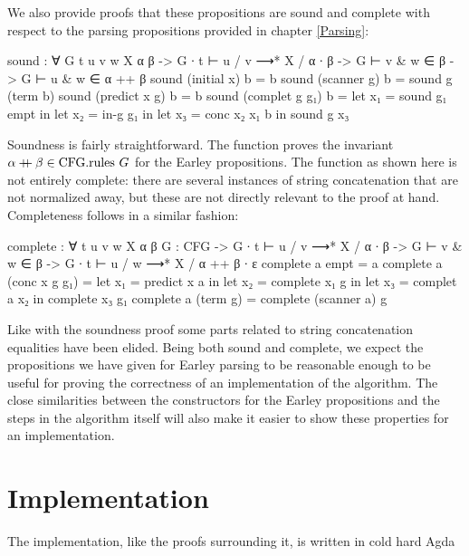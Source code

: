 		We also provide proofs that these propositions are sound and complete
		with respect to the parsing propositions provided in chapter
		\ref{Parsing}:

		\begin{code}

			sound : ∀ {G t u v w X α β} ->
			  G ∙ t ⊢ u / v ⟶* X / α ∙ β ->
			    G ⊢ v & w ∈ β ->
			    G ⊢ u & w ∈ α ++ β
			sound (initial x) b = b
			sound (scanner g) b = sound g (term b)
			sound (predict x g) b = b
			sound (complet g g₁) b =
			  let x₁ = sound g₁ empt in
			  let x₂ = in-g g₁ in
			  let x₃ = conc x₂ x₁ b in
			  sound g x₃
			
		\end{code}
	
		Soundness is fairly straightforward. The  function proves 
		the invariant $\alpha \mathbin{{+}\mspace{-8mu}{+}} \beta \in \textrm{CFG.rules } G$ for the 
		Earley propositions. The function as shown here is not entirely 
		complete: there are several instances of string concatenation that 
		are not normalized away, but these are not directly relevant to the 
		proof at hand. Completeness follows in a similar fashion:
		
		\begin{code}

			complete : ∀ {t u v w X α β} {G : CFG} ->
			  G ∙ t ⊢ u / v ⟶* X / α ∙ β ->
			  G ⊢ v & w ∈ β ->
			    G ∙ t ⊢ u / w ⟶* X / α ++ β ∙ ε
			complete a empt = a
			complete a (conc x g g₁) =
			  let x₁ = predict x a in
			  let x₂ = complete x₁ g in
			  let x₃ = complet a x₂ in
			  complete x₃ g₁
			complete a (term g) = complete (scanner a) g
	
		\end{code}

		Like with the soundness proof some parts related to string 
		concatenation equalities have been elided. Being both sound and 
		complete, we expect the propositions we have given for Earley parsing
		to be reasonable enough to be useful for proving the correctness of an 
		implementation of the algorithm. The close similarities between the 
		constructors for the Earley propositions and the steps in the algorithm 
		itself will also make it easier to show these properties for an 
		implementation.
	
	\section{Implementation}

		The implementation, like the proofs surrounding it, is written in cold 
		hard Agda

